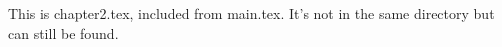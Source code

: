 This is chapter2.tex, included from main.tex. It's not in the same directory but can still be found.
